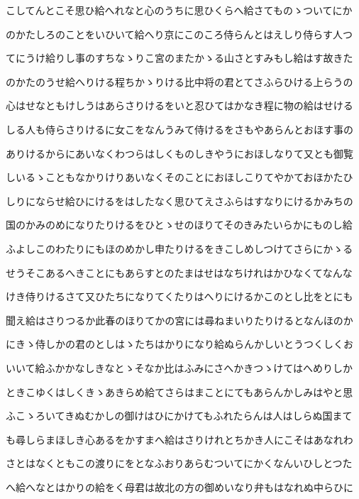 \documentclass[a4paper,11pt,landscape]{ltjtarticle}
\begin{document}
こしてんとこそ思ひ給へれなと心のうちに思ひくらへ給さてものゝついてにか
\par\medskip
のかたしろのことをいひいて給へり京にこのころ侍らんとはえしり侍らす人つ
\par\medskip
てにうけ給りし事のすちなゝりこ宮のまたかゝる山さとすみもし給はす故きた
\par\medskip
のかたのうせ給へりける程ちかゝりける比中将の君とてさふらひける上らうの
\par\medskip
心はせなともけしうはあらさりけるをいと忍ひてはかなき程に物の給はせける
\par\medskip
しる人も侍らさりけるに女こをなんうみて侍けるをさもやあらんとおほす事の
\par\medskip
ありけるからにあいなくわつらはしくものしきやうにおほしなりて又とも御覧
\par\medskip
しいるゝこともなかりけりあいなくそのことにおほしこりてやかておほかたひ
\par\medskip
しりにならせ給ひにけるをはしたなく思ひてえさふらはすなりにけるかみちの
\par\medskip
国のかみのめになりたりけるをひとゝせのほりてそのきみたいらかにものし給
\par\medskip
ふよしこのわたりにもほのめかし申たりけるをきこしめしつけてさらにかゝる
\par\medskip
せうそこあるへきことにもあらすとのたまはせはなちけれはかひなくてなんな
\par\medskip
けき侍りけるさて又ひたちになりてくたりはへりにけるかこのとし比をとにも
\par\medskip
聞え給はさりつるか此春のほりてかの宮には尋ねまいりたりけるとなんほのか
\par\medskip
にきゝ侍しかの君のとしはゝたちはかりになり給ぬらんかしいとうつくしくお
\par\medskip
いいて給ふかかなしきなとゝそなか比はふみにさへかきつゝけてはへめりしか
\par\medskip
ときこゆくはしくきゝあきらめ給てさらはまことにてもあらんかしみはやと思
\par\medskip
ふこゝろいてきぬむかしの御けはひにかけてもふれたらんは人はしらぬ国まて
\par\medskip
も尋しらまほしき心あるをかすまへ給はさりけれとちかき人にこそはあなれわ
\par\medskip
さとはなくともこの渡りにをとなふおりあらむついてにかくなんいひしとつた
\par\medskip
へ給へなとはかりの給をく母君は故北の方の御めいなり弁もはなれぬ中らひに
\par\medskip
\end{document}
